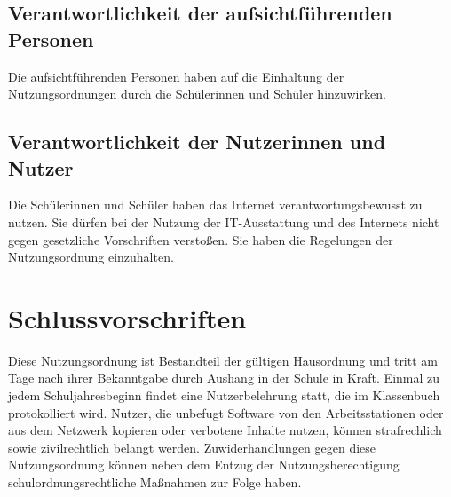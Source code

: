 \documentclass[a4paper, parskip]{scrartcl}
\begin{document}
\subsection{Verantwortlichkeit der aufsichtführenden Personen}
Die aufsichtführenden Personen haben auf die Einhaltung der Nutzungsordnungen
durch die Schülerinnen und Schüler hinzuwirken.
\subsection{Verantwortlichkeit der Nutzerinnen und Nutzer}
Die Schülerinnen und Schüler haben das Internet verantwortungsbewusst zu
nutzen. Sie dürfen bei der Nutzung der IT-Ausstattung und des Internets nicht
gegen gesetzliche Vorschriften verstoßen. Sie haben die Regelungen der
Nutzungsordnung einzuhalten.

\section{Schlussvorschriften}
Diese Nutzungsordnung ist Bestandteil der gültigen Hausordnung und tritt am
Tage nach ihrer Bekanntgabe durch Aushang in der Schule in Kraft. Einmal zu
jedem Schuljahresbeginn findet eine Nutzerbelehrung statt, die im Klassenbuch
protokolliert wird. Nutzer, die unbefugt Software von den Arbeitsstationen oder
aus dem Netzwerk kopieren oder verbotene Inhalte nutzen, können strafrechlich
sowie zivilrechtlich belangt werden. Zuwiderhandlungen gegen diese
Nutzungsordnung können neben dem Entzug der Nutzungsberechtigung
schulordnungsrechtliche Maßnahmen zur Folge haben.
\end{document}
